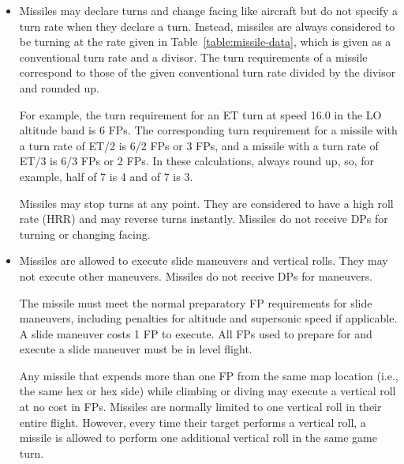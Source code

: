 {\begin{itemize}
\begin{itemize}
    \end{itemize}

    \item {} Missiles may declare turns and change facing like aircraft but do not specify a turn rate when they declare a turn. Instead, missiles are always considered to be turning at the rate given in Table~\ref{table:missile-data}, which is given as a conventional turn rate and a divisor. The turn requirements of a missile correspond to those of the given conventional turn rate divided by the divisor and rounded up.
    
    For example, the turn requirement for an ET turn at speed 16.0 in the LO altitude band is 6 FPs. The corresponding turn requirement for a missile with a turn rate of ET/2 is 6/2 FPs or 3 FPs, and a missile with a turn rate of ET/3 is 6/3 FPs or 2 FPs. In these calculations, always round up, so, for example, half of 7 is 4 and {\onethird} of 7 is 3.
    
    Missiles may stop turns at any point. They are considered to have a high roll rate (HRR) and may reverse turns instantly. Missiles do not receive DPs for turning or changing facing. 

    \item {} Missiles are allowed to execute slide maneuvers and vertical rolls. They may not execute other maneuvers. Missiles do not receive DPs for maneuvers. 

    The missile must meet the normal preparatory FP requirements for slide maneuvers, including penalties for altitude and supersonic speed if applicable. A slide maneuver costs 1 FP to execute. All FPs used to prepare for and execute a slide maneuver must be in level flight.
        
    Any missile that expends more than one FP from the same map location (i.e., the same hex or hex side) while climbing or diving may execute a vertical roll at no cost in FPs. Missiles are normally limited to one vertical roll in their entire flight. However, every time their target performs a vertical roll, a missile is allowed to perform one additional vertical roll in the same game turn.

\end{itemize}
}

